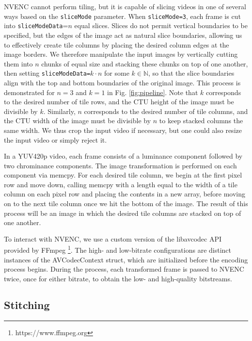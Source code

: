 NVENC cannot perform tiling, but it is capable of slicing videos in one of several ways based on the \texttt{sliceMode} parameter. When \texttt{sliceMode=3}, each frame is cut into \texttt{sliceModeData}=$n$ equal slices. Slices do not permit vertical boundaries to be specified, but the edges of the image act as natural slice boundaries, allowing us to effectively create tile columns by placing the desired column edges at the image borders. We therefore manipulate the input images by vertically cutting them into $n$ chunks of equal size and stacking these chunks on top of one another, then setting \texttt{sliceModeData=}$k \cdot n$ for some $k \in \mathbb{N}$, so that the slice boundaries align with the top and bottom boundaries of the original image. This process is demonstrated for $n=3$ and $k=1$ in Fig. \ref{fig:pipeline}. Note that $k$ corresponds to the desired number of tile rows, and the CTU height of the image must be divisible by $k$. Similarly, $n$ corresponds to the desired number of tile columns, and the CTU width of the image must be divisible by $n$ to keep stacked columns the same width. We thus crop the input video if necessary, but one could also resize the input video or simply reject it. 

In a YUV420p video, each frame consists of a luminance component followed by two chrominance components. The image transformation is performed on each component via memcpy. For each desired tile column, we begin at the first pixel row and move down, calling memcpy with a length equal to the width of a tile column on each pixel row and placing the contents in a new array, before moving on to the next tile column once we hit the bottom of the image. The result of this process will be an image in which the desired tile columns are stacked on top of one another.

To interact with NVENC, we use a custom version of the libavcodec API provided by FFmpeg \footnote{https://www.ffmpeg.org}. The high- and low-bitrate configurations are distinct instances of the AVCodecContext struct, which are initialized before the encoding process begins. During the process, each transformed frame is passed to NVENC twice, once for either bitrate, to obtain the low- and high-quality bitstreams.

\subsection{Stitching}

